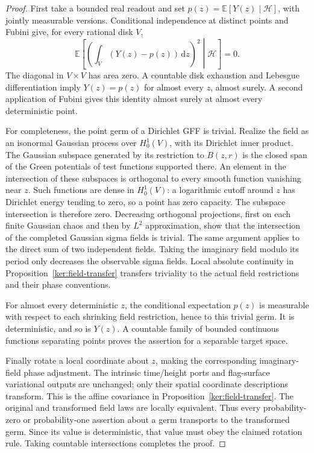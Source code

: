 \documentclass[11pt]{article}
\numberwithin{equation}{section}
\theoremstyle{definition}
\theoremstyle{remark}
\newcommand{\1}{\mathbf 1}
\begin{document}
\begin{proof}
First take a bounded real readout and set
\(p(z)=\mathbb E[Y(z)\mid\mathcal H]\), with jointly measurable versions.
Conditional independence at distinct points and Fubini give, for
every rational disk \(V\),
\[
 \mathbb E\left[\left(\int_V(Y(z)-p(z))\,\mathrm d z\right)^2
              \middle|\mathcal H\right]=0.
\]
The diagonal in \(V\times V\) has area zero.  A countable disk
exhaustion and Lebesgue differentiation imply
\(Y(z)=p(z)\) for almost every \(z\), almost surely.  A second
application of Fubini gives this identity almost surely at almost
every deterministic point.

For completeness, the point germ of a Dirichlet GFF is trivial.
Realize the field as an isonormal Gaussian process over
\(H^1_0(V)\), with its Dirichlet inner product.  The Gaussian
subspace generated by its restriction to \(B(z,r)\) is the closed
span of the Green potentials of test functions supported there.
An element in the intersection of these subspaces is orthogonal to
every smooth function vanishing near \(z\).  Such functions are
dense in \(H^1_0(V)\): a logarithmic cutoff around \(z\) has
Dirichlet energy tending to zero, so a point has zero capacity.
The subspace intersection is therefore zero.  Decreasing orthogonal
projections, first on each finite Gaussian chaos and then by
\(L^2\) approximation, show that the intersection of the completed
Gaussian sigma fields is trivial.  The same argument applies to the
direct sum of two independent fields.  Taking the imaginary field
modulo its period only decreases the observable sigma fields.
Local absolute continuity in Proposition~\ref{ker:field-transfer}
transfers triviality to the actual field restrictions and their phase
conventions.

For almost every deterministic \(z\), the conditional expectation
\(p(z)\) is measurable with respect to each shrinking field
restriction, hence to this trivial germ.  It is deterministic, and
so is \(Y(z)\).  A countable family of bounded continuous functions
separating points proves the assertion for a separable target space.

Finally rotate a local coordinate about \(z\), making the corresponding
imaginary-field phase adjustment.  The intrinsic time/height ports
and flag-surface variational outputs are unchanged; only their
spatial coordinate descriptions transform.  This is the affine
covariance in Proposition~\ref{ker:field-transfer}.  The original
and transformed field laws are locally equivalent.  Thus every
probability-zero or probability-one assertion about a germ transports
to the transformed germ.  Since its value is deterministic, that
value must obey the claimed rotation rule.  Taking countable
intersections completes the proof.
\end{proof}
\end{document}

